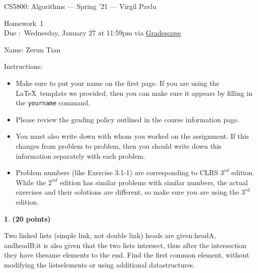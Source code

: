 \documentclass[11pt]{article}
\newcommand{\yourname}{Zerun Tian}
\theoremstyle{definition}
\newcommand{\instructor}{Virgil Pavlu}
\newcommand{\hwnum}{1}
\newcommand{\hwdue}{Wednesday, January 27 at 11:59pm via \href{https://gradescope.com/courses/229309}{Gradescope}}
\theoremstyle{theorem}
\newtheorem{prob}{}
\begin{document}
{\Large 
\begin{center}{CS5800: Algorithms} --- Spring '21 --- \instructor \end{center}}
{\large
\vspace{10pt}
\noindent Homework~\hwnum \vspace{2pt}\\
Due :~\hwdue}

\bigskip
{\large \noindent Name: \yourname }

\vspace{15pt}

{\large \noindent Instructions:}

\begin{itemize}

\item Make sure to put your name on the first page.  If you are using the \LaTeX~template we provided, then you can make sure it appears by filling in the \texttt{yourname} command.

\item Please review the grading policy outlined in the course information page.

\item You must also write down with whom you worked on the assignment.  If this changes from problem to problem, then you should write down this information separately with each problem.

\item Problem numbers (like Exercise 3.1-1) are corresponding to CLRS $3^{rd}$ edition.  While the  $2^{nd}$ edition  has  similar  problems  with  similar  numbers,  the  actual  exercises  and their solutions are different, so make sure you are using the $3^{rd}$ edition.

\end{itemize}

\newpage

\begin{prob} \textbf{(20 points)}
\end{prob}

Two linked lists (simple link, not double link) heads are given:headA, andheadB;it is also given that the two lists intersect,  thus after the intersection they have thesame elements to the end.  Find the first common element, without modifying the listselements or using additional datastructures.
\end{document}
